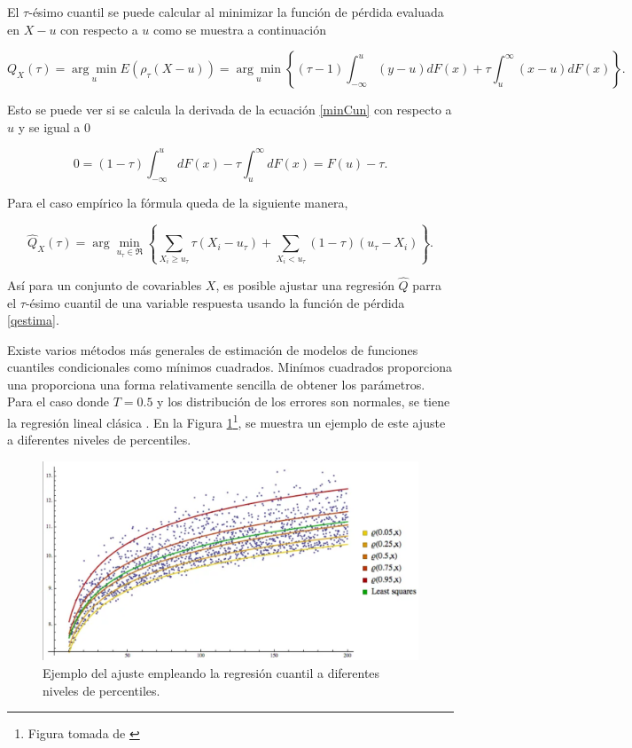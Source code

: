     El $\tau$-ésimo cuantil se puede calcular al minimizar la función de pérdida evaluada en $X-u$ con respecto a $u$ como se muestra a continuación \cite{Koenker2005}
    
    \begin{equation}\label{minCun}
        Q_X(\tau)=\underset{u}{\arg \min } E\left(\rho_\tau(X-u)\right)=\underset{u}{\arg \min }\left\{(\tau-1) \int_{-\infty}^u(y-u) d F(x)+\tau \int_u^{\infty}(x-u) d F(x)\right\} .
    \end{equation}

    Esto se puede ver si se calcula la derivada de la ecuación \eqref{minCun} con respecto a $u$ y se igual a $0$

    \begin{equation}\label{perdidaF}
        0=(1-\tau) \int_{-\infty}^{u} d F(x)-\tau \int_{u}^{\infty} d F(x)=F(u)-\tau.
    \end{equation}

    Para el caso empírico la fórmula queda de la siguiente manera, 

    \begin{equation}\label{qestima}
        \widehat{Q}_{X}(\tau)=\arg \min _{u_\tau \in \Re}\left\{\sum_{X_i \geq u_\tau} \tau \left(X_i-u_\tau\right)+\sum_{X_i< u_\tau}(1-\tau) \left(u_\tau-X_i\right)\right\}.
    \end{equation}

    Así para un conjunto de covariables $X$, es posible ajustar una regresión $\widehat{Q}$ parra el $\tau$-ésimo cuantil de una variable respuesta usando la función de pérdida \eqref{qestima}.

    Existe varios métodos más generales de estimación de modelos de funciones cuantiles condicionales como mínimos cuadrados. Minímos cuadrados proporciona una proporciona una forma relativamente sencilla de obtener los parámetros. Para el caso donde $T = 0.5$ y los distribución de los errores son normales, se tiene la regresión lineal clásica \cite{Koenker2005}. En la Figura \ref{fig:regQ}\footnote{Figura tomada de \cite{ImgRegCuantile}}, se muestra un ejemplo de este ajuste a diferentes niveles de percentiles.

    \begin{figure}[H]
    \centering
    \includegraphics[width = 0.9 \textwidth]{Imagenes/Quantilsregression.png}
    \caption{Ejemplo del ajuste empleando la regresión cuantil a diferentes niveles de percentiles.}
    \label{fig:regQ}
    \end{figure}
    

